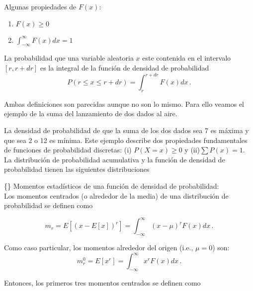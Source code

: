 \documentclass[
]{agujournal2019}
\providecommand{\tightlist}{%
  \setlength{\itemsep}{0pt}\setlength{\parskip}{0pt}}\usepackage{longtable,booktabs,array}
\begin{document}
Algunas propiedades de \(F(x)\):\\

\begin{enumerate}
\def\labelenumi{(\arabic{enumi})}
\tightlist
\item
  \(F(x)\ge0\)\\
\item
  \(\int^{\infty}_{-\infty} F(x) dx=1\)\\
\end{enumerate}

La probabilidad que una variable aleatoria \(x\) este contenida en el
intervalo \([r,r+dr]\) es la integral de la función de densidad de
probabilidad \[P(r\le x\le r+dr)=\int^{r+dr}_r F(x)dx\,.\]

Ambas definiciones son parecidas aunque no son lo mismo. Para ello
veamos el ejemplo de la suma del lanzamiento de dos dados al aire.\\

\begin{center}
\end{center}

La densidad de probabilidad de que la suma de los dos dados sea 7 es
máxima y que sea 2 o 12 es mínima. Este ejemplo describe dos propiedades
fundamentales de funciones de probabilidad discretas: (i)
\(P(X=x) \ge 0\) y (ii)\(\sum{P(x)}=1\). La distribución de probabilidad
acumulativa y la función de densidad de probabilidad tienen las
siguientes distribuciones\\

\begin{center}
\end{center}

\vspace{0.5cm}

\{\noindent\} Momentos estadísticos de una función de densidad de
probabilidad:\\

Los momentos centrados (o alrededor de la media) de una distribución de
probabilidad se definen como

\[m_r=E[(x-E[x])^r]=\int^{\infty}_{-\infty} (x-\mu)^rF(x)dx\,.\]

Como caso particular, los momentos alrededor del origen (i.e.,
\(\mu=0\)) son: \[m^0_r=E[x^r]=\int^{\infty}_{-\infty} x^rF(x)dx\,.\]

Entonces, los primeros tres momentos centrados se definen como
\end{document}
